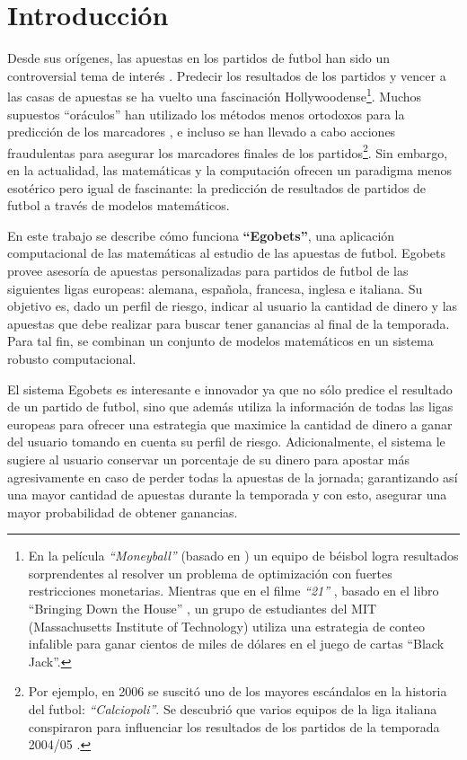 \chapter{Introducción}\label{chap:introduccion}

Desde sus orígenes, las apuestas en los partidos de futbol han sido un controversial tema de interés \cite{udovicic1998special}. Predecir los resultados de los partidos y vencer a las casas de apuestas se ha vuelto una fascinación Hollywoodense\footnote{En la película \emph{``Moneyball''} \cite{moneyball} (basado en \cite{lewis2004moneyball}) un equipo de béisbol logra resultados sorprendentes al resolver un problema de optimización con fuertes restricciones monetarias. Mientras que en el filme \emph{``21''} \cite{21Movie}, basado en el libro ``Bringing Down the House'' \cite{patrick2008bringing}, un grupo de estudiantes del MIT (Massachusetts Institute of Technology) utiliza una estrategia de conteo infalible para ganar cientos de miles de dólares en el juego de cartas ``Black Jack''.}. Muchos supuestos ``oráculos'' han utilizado los métodos menos ortodoxos para la predicción de los marcadores \cite{prevos2010psychic}, e incluso se han llevado a cabo acciones fraudulentas para asegurar los marcadores finales de los partidos\footnote{Por ejemplo, en 2006 se suscitó uno de los mayores escándalos en la historia del futbol: \emph{``Calciopoli''}. Se descubrió que varios equipos de la liga italiana conspiraron para influenciar los resultados de los partidos de la temporada 2004/05 \cite{distaso2008corruption}.}. Sin embargo, en la actualidad, las matemáticas y la computación ofrecen un paradigma menos esotérico pero igual de fascinante: la predicción de resultados de partidos de futbol a través de modelos matemáticos.

En este trabajo se describe cómo funciona \textbf{``Egobets''}, una aplicación computacional de las matemáticas al estudio de las apuestas de futbol. Egobets provee asesoría de apuestas personalizadas para partidos de futbol de las siguientes ligas europeas: alemana, española, francesa, inglesa e italiana. Su objetivo es, dado un perfil de riesgo, indicar al usuario la cantidad de dinero y las apuestas que debe realizar para buscar tener ganancias al final de la temporada. Para tal fin, se combinan un conjunto de modelos matemáticos en un sistema robusto computacional.

El sistema Egobets es interesante e innovador ya que no sólo predice el resultado de un partido de futbol, sino que además utiliza la información de todas las ligas europeas para ofrecer una estrategia que maximice la cantidad de dinero a ganar del usuario tomando en cuenta su perfil de riesgo. Adicionalmente, el sistema le sugiere al usuario conservar un porcentaje de su dinero para apostar más agresivamente en caso de perder todas la apuestas de la jornada; garantizando así una mayor cantidad de apuestas durante la temporada y con esto, asegurar una mayor probabilidad de obtener ganancias.

